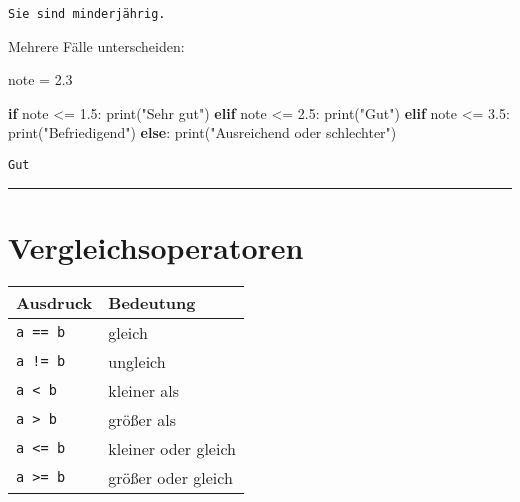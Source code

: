 \documentclass[
  letterpaper,
  DIV=11,
  numbers=noendperiod]{scrreprt}
\newenvironment{Shaded}{\begin{snugshade}}{\end{snugshade}}
\newcommand{\BuiltInTok}[1]{\textcolor[rgb]{0.00,0.23,0.31}{#1}}
\newcommand{\ControlFlowTok}[1]{\textcolor[rgb]{0.00,0.23,0.31}{\textbf{#1}}}
\newcommand{\FloatTok}[1]{\textcolor[rgb]{0.68,0.00,0.00}{#1}}
\newcommand{\NormalTok}[1]{\textcolor[rgb]{0.00,0.23,0.31}{#1}}
\newcommand{\OperatorTok}[1]{\textcolor[rgb]{0.37,0.37,0.37}{#1}}
\newcommand{\StringTok}[1]{\textcolor[rgb]{0.13,0.47,0.30}{#1}}
\begin{document}
\begin{verbatim}
Sie sind minderjährig.
\end{verbatim}

Mehrere Fälle unterscheiden:

\begin{Shaded}
\begin{Highlighting}[]
\NormalTok{note }\OperatorTok{=} \FloatTok{2.3}

\ControlFlowTok{if}\NormalTok{ note }\OperatorTok{\textless{}=} \FloatTok{1.5}\NormalTok{:}
    \BuiltInTok{print}\NormalTok{(}\StringTok{"Sehr gut"}\NormalTok{)}
\ControlFlowTok{elif}\NormalTok{ note }\OperatorTok{\textless{}=} \FloatTok{2.5}\NormalTok{:}
    \BuiltInTok{print}\NormalTok{(}\StringTok{"Gut"}\NormalTok{)}
\ControlFlowTok{elif}\NormalTok{ note }\OperatorTok{\textless{}=} \FloatTok{3.5}\NormalTok{:}
    \BuiltInTok{print}\NormalTok{(}\StringTok{"Befriedigend"}\NormalTok{)}
\ControlFlowTok{else}\NormalTok{:}
    \BuiltInTok{print}\NormalTok{(}\StringTok{"Ausreichend oder schlechter"}\NormalTok{)}
\end{Highlighting}
\end{Shaded}

\begin{verbatim}
Gut
\end{verbatim}

\begin{center}\rule{0.5\linewidth}{0.5pt}\end{center}

\section{Vergleichsoperatoren}\label{vergleichsoperatoren}

\begin{longtable}[]{@{}ll@{}}
\toprule\noalign{}
Ausdruck & Bedeutung \\
\midrule\noalign{}
\endhead
\bottomrule\noalign{}
\endlastfoot
\texttt{a\ ==\ b} & gleich \\
\texttt{a\ !=\ b} & ungleich \\
\texttt{a\ \textless{}\ b} & kleiner als \\
\texttt{a\ \textgreater{}\ b} & größer als \\
\texttt{a\ \textless{}=\ b} & kleiner oder gleich \\
\texttt{a\ \textgreater{}=\ b} & größer oder gleich \\
\end{longtable}
\end{document}
